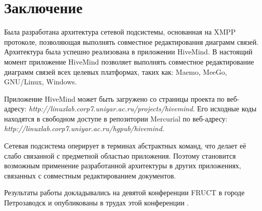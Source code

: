 \newpage

\chapter*{Заключение}


Была разработана архитектура сетевой подсистемы, основанная на
XMPP протоколе, позволяющая выполнять совместное редактирования диаграмм связей.
Архитектура была успешно реализована в приложении HiveMind. В настоящий момент
приложение HiveMind позволяет выполнять совместное редактирование диаграмм
связей всех целевых платформах, таких как: Maemo, MeeGo, GNU/Linux, Windows.

Приложение HiveMind может быть загружено со страницы проекта по веб-адресу:
\emph{http://linuxlab.corp7.uniyar.ac.ru/projects/hivemind}. Его исходные коды
находятся в свободном доступе в репозитории Mercurial по веб-адресу:
\emph{http://linuxlab.corp7.uniyar.ac.ru/hgpub/hivemind}.

Сетевая подсистема оперирует в терминах абстрактных команд, что делает её
слабо связанной с предметной областью приложения. Поэтому становится возможным
применение разработанной архитектуры в других приложениях, связанных с
совместным редактированием документов.

Результаты работы докладывались на девятой конференции FRUCT в городе
Петрозаводск и опубликованы в трудах этой конференции \cite{hivemind-9th-fruct}.
